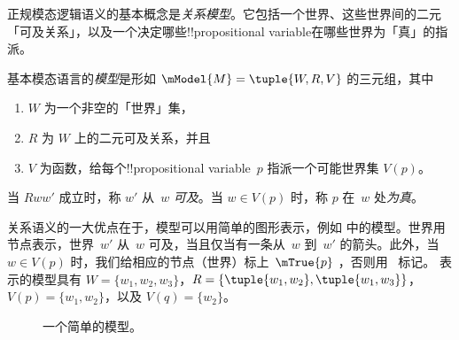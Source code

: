 \documentclass[../../../include/open-logic-section]{subfiles}
\begin{document}


正规模态逻辑语义的基本概念是\emph{关系模型}。它包括一个世界、这些世界间的二元「可及关系」，以及一个决定哪些!!{propositional variable}在哪些世界为「真」的指派。

\begin{defn}
  基本模态语言的\emph{模型}是形如 $\mModel{M}
  = \tuple{W, R, V}$ 的三元组，其中
  \begin{enumerate}
  \item $W$ 为一个非空的「世界」集，
  \item $R$ 为 $W$ 上的二元可及关系，并且
  \item $V$ 为函数，给每个!!{propositional
    variable}~$p$ 指派一个可能世界集 $V(p)$。
  \end{enumerate}
  当 $Rww'$ 成立时，称 $w'$ 从~$w$ \emph{可及}。当 $w \in
  V(p)$ 时，称 $p$ 在~$w$ 处\emph{为真}。
\end{defn}

关系语义的一大优点在于，模型可以用简单的图形表示，例如 中的模型。世界用节点表示，世界~$w'$ 从~$w$ 可及，当且仅当有一条从~$w$ 到~$w'$ 的箭头。此外，当 $w \in V(p)$ 时，我们给相应的节点（世界）标上~$\mTrue{p}$ ，否则用~ 标记。
 表示的模型具有 $W = \{w_1, w_2, w_3\}$，$R =
\{\tuple{w_1, w_2},\tuple{w_1, w_3}\}$，$V(p) = \{w_1, w_2\}$，以及
$V(q) = \{w_2\}$。

\begin{figure}
  \begin{center}
  \end{center}
  \caption{一个简单的模型。}
\end{figure}
\end{document}
